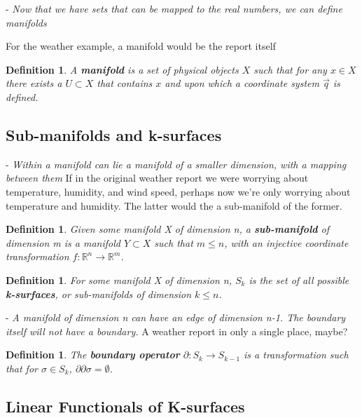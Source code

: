 \documentclass{book}
\newtheorem{defn}[equation]{Definition}
\begin{document}
- \emph{Now that we have sets that can be mapped to the real numbers, we can define manifolds}

For the weather example, a manifold would be the report itself
 
\begin{defn}
	A \textbf{manifold} is a set of physical objects $X$ such that for any $x \in X$ there exists a $U \subset X$ that contains $x$ and upon which a coordinate system $\vec{q}$ is defined.
\end{defn}




\subsection{Sub-manifolds and k-surfaces}

- \emph{Within a manifold can lie a manifold of a smaller dimension, with a mapping between them}
If in the original weather report we were worrying about temperature, humidity, and wind speed, perhaps now we're only worrying about temperature and humidity. The latter would the a sub-manifold of the former. 

\begin{defn}
	Given some manifold X of dimension n, a \textbf{sub-manifold} of dimension m is a manifold $Y \subset X$ such that $m \leq n$, with an injective coordinate transformation $f: \mathbb{R}^n \to \mathbb{R}^m$. 
\end{defn}

\begin{defn}
	For some manifold X of dimension n, $S_k$ is the set of all possible \textbf{k-surfaces}, or sub-manifolds of dimension $k \leq n$. 
\end{defn}

- \emph{A manifold of dimension n can have an edge of dimension n-1. The boundary itself will not have a boundary.}
A weather report in only a single place, maybe?  

\begin{defn}
	The \textbf{boundary operator} $\partial : S_k \to S_{k-1}$ is a transformation such that for $\sigma \in S_k$, $\partial\partial\sigma = \emptyset$. 
\end{defn}



\subsection{Linear Functionals of K-surfaces}
\end{document}
